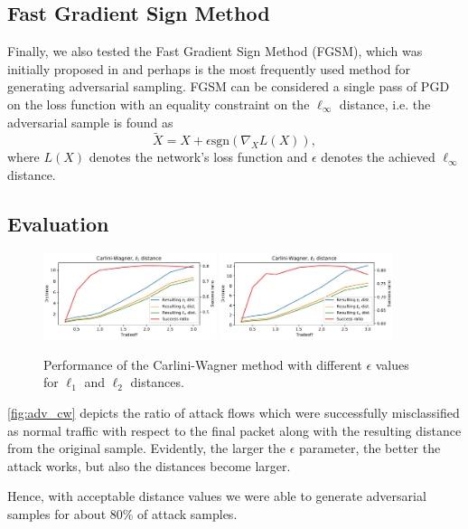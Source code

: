 \documentclass[conference]{IEEEtran}
\begin{document}
\subsection{Fast Gradient Sign Method}
Finally, we also tested the Fast Gradient Sign Method (FGSM), which was initially proposed in \cite{goodfellow2014explaining} and perhaps is the most frequently used method for generating adversarial sampling. FGSM can be considered a single pass of PGD on the loss function with an equality constraint on the $\ell_\infty$ distance, i.e. the adversarial sample is found as
\begin{equation}
\tilde X = X + \epsilon \text{sgn}( \nabla_X L(X)),
\end{equation}
where $L(X)$ denotes the network's loss function and $\epsilon$ denotes the achieved $\ell_\infty$ distance.

\subsection{Evaluation}
\begin{figure}
\includegraphics[width=0.45\textwidth]{adv_plots/cwl1.pdf}
\includegraphics[width=0.45\textwidth]{adv_plots/cwl2.pdf}
\caption{Performance of the Carlini-Wagner method with different $\epsilon$ values for $\ell_1$ and $\ell_2$ distances.}
\label{fig:adv_cw}
\end{figure}
\autoref{fig:adv_cw} depicts the ratio of attack flows which were successfully misclassified as normal traffic with respect to the final packet along with the resulting distance from the original sample. Evidently, the larger the $\epsilon$ parameter, the better the attack works, but also the distances become larger.

Hence, with acceptable distance values we were able to generate adversarial samples for about 80\% of attack samples.
\end{document}
